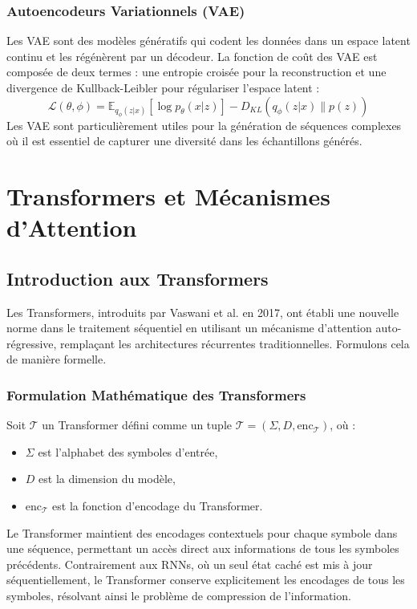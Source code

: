 \documentclass[13pt,a4paper]{article}
\begin{document}
\subsubsection{Autoencodeurs Variationnels (VAE)}
Les VAE sont des modèles génératifs qui codent les données dans un espace latent continu et les régénèrent par un décodeur. La fonction de coût des VAE est composée de deux termes : une entropie croisée pour la reconstruction et une divergence de Kullback-Leibler pour régulariser l'espace latent :
\[
\mathcal{L}(\theta, \phi) = \mathbb{E}_{q_\phi(z|x)}[\log p_\theta(x|z)] - D_{KL}(q_\phi(z|x) \| p(z))
\]
Les VAE sont particulièrement utiles pour la génération de séquences complexes où il est essentiel de capturer une diversité dans les échantillons générés.

\section{Transformers et Mécanismes d'Attention}

\subsection{Introduction aux Transformers}

Les Transformers, introduits par Vaswani et al. en 2017, ont établi une nouvelle norme dans le traitement séquentiel en utilisant un mécanisme d'attention auto-régressive, remplaçant les architectures récurrentes traditionnelles. Formulons cela de manière formelle.

\subsubsection{Formulation Mathématique des Transformers}

Soit $\mathcal{T}$ un Transformer défini comme un tuple $\mathcal{T} = (\Sigma, D, \text{enc}_{\mathcal{T}})$, où :
\begin{itemize}
    \item $\Sigma$ est l'alphabet des symboles d'entrée,
    \item $D$ est la dimension du modèle,
    \item $\text{enc}_{\mathcal{T}}$ est la fonction d'encodage du Transformer.
\end{itemize}

Le Transformer maintient des encodages contextuels pour chaque symbole dans une séquence, permettant un accès direct aux informations de tous les symboles précédents. Contrairement aux RNNs, où un seul état caché est mis à jour séquentiellement, le Transformer conserve explicitement les encodages de tous les symboles, résolvant ainsi le problème de compression de l'information.
\end{document}
